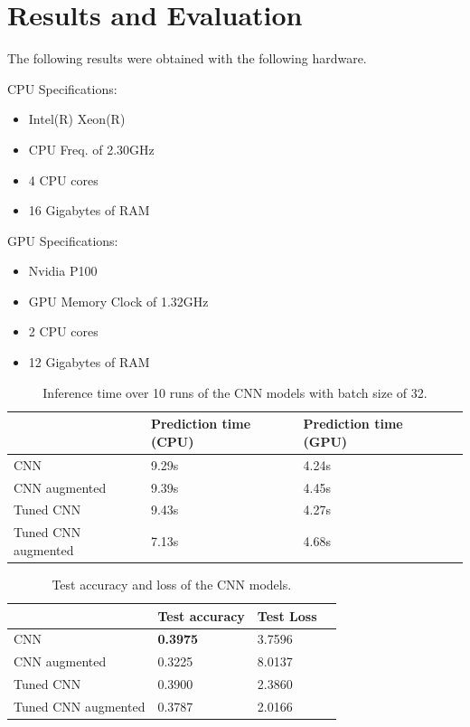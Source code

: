 \section{Results and Evaluation}
The following results were obtained with the following hardware.

\vspace{4mm}
\noindent
\begin{minipage}{0.45\textwidth}
  CPU Specifications:
  \begin{itemize}
    \item Intel(R) Xeon(R)
    \item CPU Freq. of 2.30GHz
    \item 4 CPU cores
    \item 16 Gigabytes of RAM
  \end{itemize}
\end{minipage}
\hfill
\begin{minipage}{0.5\textwidth}
  GPU Specifications:
  \begin{itemize}
    \item Nvidia P100
    \item GPU Memory Clock of 1.32GHz
    \item 2 CPU cores
    \item 12 Gigabytes of RAM
  \end{itemize}
\end{minipage}


\begin{table}[ht]
\begin{tabular}{|l|l|l|l|}
\hline
                    & Prediction time (CPU) & Prediction time (GPU) \\ \hline
CNN                 & 9.29s                 & 4.24s                 \\ \hline
CNN augmented       & 9.39s                 & 4.45s                 \\ \hline
Tuned CNN           & 9.43s                 & 4.27s                 \\ \hline
Tuned CNN augmented & 7.13s                 & 4.68s                 \\ \hline
\end{tabular}
\caption{Inference time over 10 runs of the CNN models with batch size of 32.}
\label{table:pred_time}
\end{table}


\begin{table}[ht]
\begin{tabular}{|l|l|l|l|}
\hline
                    & Test accuracy   & Test Loss \\ \hline
CNN                 & \textbf{0.3975} & 3.7596    \\ \hline
CNN augmented       & 0.3225          & 8.0137    \\ \hline
Tuned CNN           & 0.3900          & 2.3860    \\ \hline
Tuned CNN augmented & 0.3787          & 2.0166    \\ \hline
\end{tabular}
\caption{Test accuracy and loss of the CNN models.}
\label{table:test_CNN}
\end{table}

